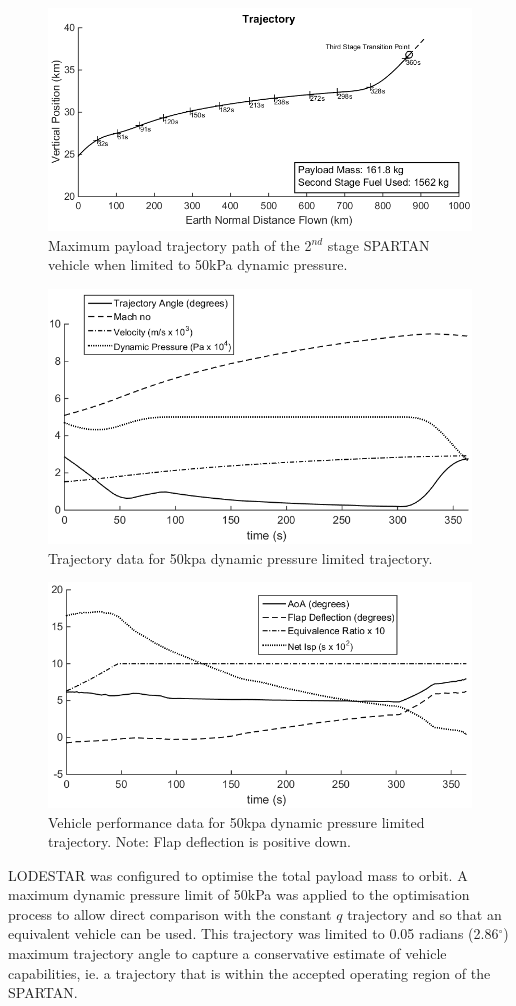 \documentclass[]{aiaa-tc}
\begin{document}
\begin{figure}[ht]
	\centering
	\includegraphics[width=.7\linewidth]{qlimited50kPa}
	\caption{Maximum payload trajectory path of the 2$^{nd}$ stage SPARTAN vehicle when limited to 50kPa dynamic pressure.}
	\label{fig:qlimited}
\end{figure}
\begin{figure}[ht]
	\centering
	\includegraphics[width=.6\linewidth]{qlimited50kPa-aero}
	\caption{Trajectory data for 50kpa dynamic pressure limited trajectory.}
	\label{fig:qlimited aero}
\end{figure}
\begin{figure}[ht]
	\centering
	\includegraphics[width=.6\linewidth]{qlimited-Vehicle}
	\caption{Vehicle performance data for 50kpa dynamic pressure limited trajectory. Note: Flap deflection is positive down.}
	\label{fig:qlimited vehicle}
\end{figure}



LODESTAR was configured to optimise the total payload mass to orbit.
A maximum dynamic pressure limit of 50kPa was applied to the optimisation process to allow direct comparison with the constant $q$ trajectory and so that an equivalent vehicle can be used.   
 This trajectory was limited to 0.05 radians (2.86$^{\circ}$) maximum trajectory angle to capture a conservative estimate of vehicle capabilities, ie. a trajectory that is within the accepted operating region of the SPARTAN. 
\end{document}
